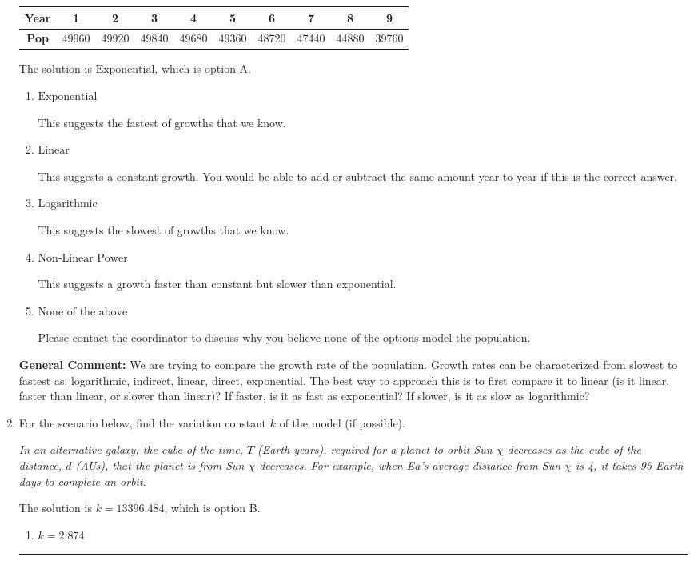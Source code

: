 \documentclass{extbook}[14pt]
\newcommand{\litem}[1]{\item #1

\rule{\textwidth}{0.4pt}}
\begin{document}
\begin{enumerate}
{\begin{tabular}{c|c|c|c|c|c|c|c|c|c}
\textbf{Year} &1 &2 &3 &4 &5 &6 &7 &8 &9\tabularnewline \hline
\textbf{Pop} &49960 &49920 &49840 &49680 &49360 &48720 &47440 &44880 &39760\end{tabular}The solution is \( \text{Exponential} \), which is option A.\begin{enumerate}[label=\Alph*.]
\item \( \text{Exponential} \)

This suggests the fastest of growths that we know.
\item \( \text{Linear} \)

This suggests a constant growth. You would be able to add or subtract the same amount year-to-year if this is the correct answer.
\item \( \text{Logarithmic} \)

This suggests the slowest of growths that we know.
\item \( \text{Non-Linear Power} \)

This suggests a growth faster than constant but slower than exponential.
\item \( \text{None of the above} \)

Please contact the coordinator to discuss why you believe none of the options model the population.
\end{enumerate}

\textbf{General Comment:} We are trying to compare the growth rate of the population. Growth rates can be characterized from slowest to fastest as: logarithmic, indirect, linear, direct, exponential. The best way to approach this is to first compare it to linear (is it linear, faster than linear, or slower than linear)? If faster, is it as fast as exponential? If slower, is it as slow as logarithmic?
}
\litem{
For the scenario below, find the variation constant $k$ of the model (if possible).

\begin{center}
    \textit{ In an alternative galaxy, the cube of the time, $T$ (Earth years), required for a planet to orbit Sun $\chi$ decreases as the cube of the distance, $d$ (AUs), that the planet is from Sun $\chi$ decreases. For example, when Ea's average distance from Sun $\chi$ is 4, it takes 95 Earth days to complete an orbit. }
\end{center}
The solution is \( k = 13396.484 \), which is option B.\begin{enumerate}[label=\Alph*.]
\item \( k = 2.874 \)


\end{enumerate}}
\end{enumerate}
\end{document}
